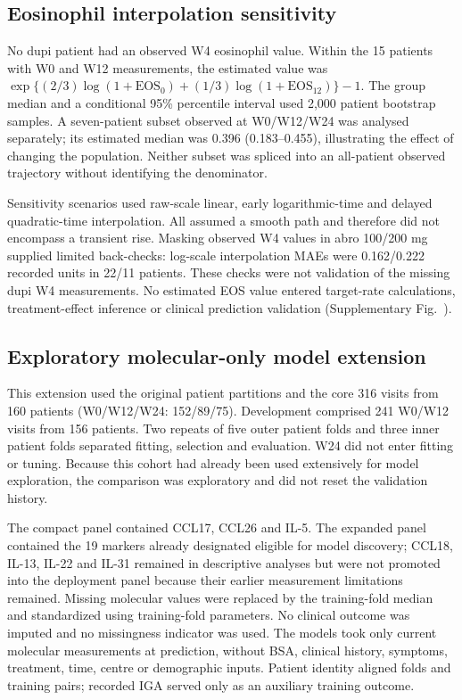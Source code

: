 \subsection*{Eosinophil interpolation sensitivity}
No dupi patient had an observed W4 eosinophil value. Within the 15 patients with W0 and W12 measurements, the estimated value was $\exp\{(2/3)\log(1+\mathrm{EOS}_0)+(1/3)\log(1+\mathrm{EOS}_{12})\}-1$. The group median and a conditional 95\% percentile interval used 2,000 patient bootstrap samples. A seven-patient subset observed at W0/W12/W24 was analysed separately; its estimated median was 0.396 (0.183--0.455), illustrating the effect of changing the population. Neither subset was spliced into an all-patient observed trajectory without identifying the denominator.

Sensitivity scenarios used raw-scale linear, early logarithmic-time and delayed quadratic-time interpolation. All assumed a smooth path and therefore did not encompass a transient rise. Masking observed W4 values in abro 100/200 mg supplied limited back-checks: log-scale interpolation MAEs were 0.162/0.222 recorded units in 22/11 patients. These checks were not validation of the missing dupi W4 measurements. No estimated EOS value entered target-rate calculations, treatment-effect inference or clinical prediction validation (Supplementary Fig.~).

\subsection*{Exploratory molecular-only model extension}
This extension used the original patient partitions and the core 316 visits from 160 patients (W0/W12/W24: 152/89/75). Development comprised 241 W0/W12 visits from 156 patients. Two repeats of five outer patient folds and three inner patient folds separated fitting, selection and evaluation. W24 did not enter fitting or tuning. Because this cohort had already been used extensively for model exploration, the comparison was exploratory and did not reset the validation history.

The compact panel contained CCL17, CCL26 and IL-5. The expanded panel contained the 19 markers already designated eligible for model discovery; CCL18, IL-13, IL-22 and IL-31 remained in descriptive analyses but were not promoted into the deployment panel because their earlier measurement limitations remained. Missing molecular values were replaced by the training-fold median and standardized using training-fold parameters. No clinical outcome was imputed and no missingness indicator was used. The models took only current molecular measurements at prediction, without BSA, clinical history, symptoms, treatment, time, centre or demographic inputs. Patient identity aligned folds and training pairs; recorded IGA served only as an auxiliary training outcome.

